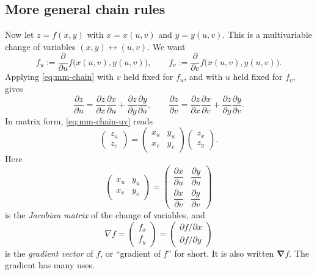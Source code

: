 \subsection{More general chain rules}
Now let $z=f(x,y)$ with $x=x(u,v)$ and $y=y(u,v)$. This is a multivariable
change of variables $(x,y)\leftrightarrow(u,v)$. We want
\[
 f_u:=\frac{\partial}{\partial u}f\bigl(x(u,v),y(u,v)\bigr),
 \qquad
 f_v:=\frac{\partial}{\partial v}f\bigl(x(u,v),y(u,v)\bigr).
\]
Applying \eqref{eq:mm-chain} with $v$ held fixed for $f_u$, and with $u$ held
fixed for $f_v$, gives
\begin{equation}
 \boxed{
 \frac{\partial z}{\partial u}=\frac{\partial z}{\partial x}\frac{\partial x}{\partial u}
 +\frac{\partial z}{\partial y}\frac{\partial y}{\partial u},
 \qquad
 \frac{\partial z}{\partial v}=\frac{\partial z}{\partial x}\frac{\partial x}{\partial v}
 +\frac{\partial z}{\partial y}\frac{\partial y}{\partial v}}.
 \tag{3}\label{eq:mm-chain-uv}
\end{equation}
In matrix form, \eqref{eq:mm-chain-uv} reads
\begin{equation}
 \begin{pmatrix} z_u\\ z_v\end{pmatrix}
 =\begin{pmatrix} x_u&y_u\\ x_v&y_v\end{pmatrix}
  \begin{pmatrix} z_x\\ z_y\end{pmatrix}.
 \tag{3'}
\end{equation}
Here
\[
 \begin{pmatrix} x_u&y_u\\ x_v&y_v\end{pmatrix}
 =\begin{pmatrix}
  \dfrac{\partial x}{\partial u}&\dfrac{\partial y}{\partial u}\\[8pt]
  \dfrac{\partial x}{\partial v}&\dfrac{\partial y}{\partial v}
 \end{pmatrix}
\]
is the \emph{Jacobian matrix} of the change of variables, and
\[
 \nabla f=\begin{pmatrix} f_x\\ f_y\end{pmatrix}
 =\begin{pmatrix} \partial f/\partial x\\ \partial f/\partial y\end{pmatrix}
\]
is the \emph{gradient vector} of $f$, or ``gradient of $f$'' for short.
It is also written $\boldsymbol\nabla f$. The gradient has many uses.

